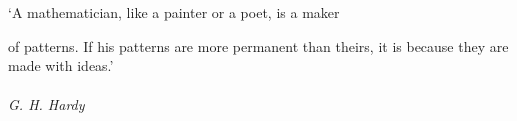 
\clearpage

\narrowlinespacing

\vspace*{4mm}

`A mathematician, like a painter or a poet, is a maker 

of patterns. If his patterns are more permanent than
  theirs, it is because they are made with ideas.'\\
\\
\emph{G. H. Hardy}

\normallinespacing
